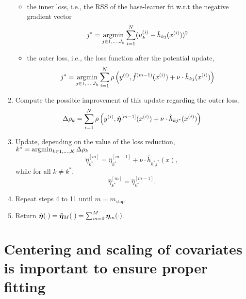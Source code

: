 \begin{algorithm}
\begin{enumerate}
\begin{itemize}
            \item the inner loss, i.e., the RSS of the base-learner fit w.r.t the negative gradient vector
                \begin{equation}
                    j^*=\operatorname*{argmin}_{j\in 1,\ldots,J_k}\sum_{i=1}^N(u_k^{(i)}-\hat{h}_{kj}(x^{(i)}))^2
                \end{equation}
            \item the outer loss, i.e., the loss function after the potential update,
                \begin{equation}
                    j^*=\operatorname*{argmin}_{j\in 1,\ldots,J_k}\sum_{i=1}^N\rho\left(y^{(i)}, \hat{f}^{(m-1)}(x^{(i)}) + \nu \cdot \hat{h}_{kj}(x^{(i)}) \right)
                \end{equation}
        \end{itemize}
    \item Compute the possible improvement of this update regarding the outer loss,
        \begin{equation}
            \Delta\rho_k=\sum_{i=1}^N\rho\left(y^{(i)}, \hat{\boldsymbol{\eta}}^{[m-1]}(x^{(i)}) + \nu \cdot \hat{h}_{kj^*}(x^{(i)}) \right)
        \end{equation}
    \item Update, depending on the value of the loss reduction, $k^*=\operatorname*{argmin}_{k\in1,\ldots,K}\Delta\rho_k$
        \begin{equation}
            \hat{\eta}^{[m]}_{k^*}=\hat{\eta}^{[m-1]}_{k^*}+\nu\cdot\hat{h}_{k^*j^*}(x),
        \end{equation}
        while for all $k\neq k^*$,
        \begin{equation}
            \hat{\eta}^{[m]}_{k^*}=\hat{\eta}^{[m-1]}_{k^*}.
        \end{equation}
    \item Repeat steps 4 to 11 until $m=m_{\text{stop}}$.
    \item Return $\hat{\boldsymbol{\eta}}(\cdot)=\hat{\boldsymbol{\eta}}_M(\cdot)=\sum_{m=0}^M\boldsymbol{\eta}_m(\cdot)$.
\end{enumerate}
\end{algorithm}


\section{Centering and scaling of covariates is important to ensure proper fitting}
